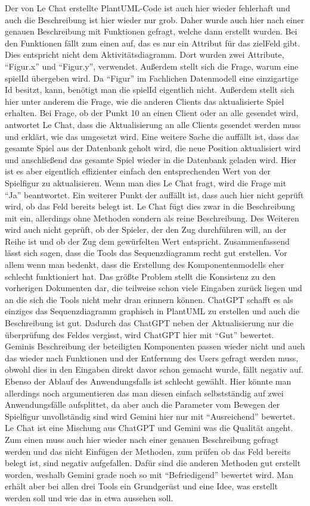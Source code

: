 Der von Le Chat erstellte PlantUML-Code ist auch hier wieder fehlerhaft und auch die Beschreibung ist hier wieder nur 
grob. Daher wurde auch hier nach einer genauen Beschreibung mit Funktionen gefragt, welche dann erstellt wurden.
Bei den Funktionen fällt zum einen auf, das es nur ein Attribut für das zielFeld gibt. Dies entspricht nicht dem 
Aktivitätsdiagramm. Dort wurden zwei Attribute, ``Figur.x'' und ``Figur.y'', verwendet. Außerdem stellt sich die 
Frage, warum eine spielId übergeben wird. Da ``Figur'' im Fachlichen Datenmodell eine einzigartige Id besitzt, 
kann, benötigt man die spielId eigentlich nicht. Außerdem stellt sich hier unter anderem die Frage, wie die anderen
Clients das aktualisierte Spiel erhalten. Bei Frage, ob der Punkt 10 an einen Client oder an alle gesendet wird, 
antwortet Le Chat, dass die Aktualisierung an alle Clients gesendet werden muss und erklärt, wie das umgesetzt wird.
Eine weitere Sache die auffällt ist, dass das gesamte Spiel aus der Datenbank geholt wird, die neue Position 
aktualisiert wird und anschließend das gesamte Spiel wieder in die Datenbank geladen wird. Hier ist es aber 
eigentlich effizienter einfach den entsprechenden Wert von der Spielfigur zu aktualisieren. Wenn man dies 
Le Chat fragt, wird die Frage mit ``Ja'' beantwortet. Ein weiterer Punkt der auffällt ist, dass auch hier nicht 
geprüft wird, ob das Feld bereits belegt ist. Le Chat fügt dies zwar in die Beschreibung mit ein, allerdings 
ohne Methoden sondern als reine Beschreibung. Des Weiteren wird auch nicht geprüft, ob der Spieler, der den 
Zug durchführen will, an der Reihe ist und ob der Zug dem gewürfelten Wert entspricht. 
Zusammenfassend lässt sich sagen, dass die Tools das Sequenzdiagramm recht gut erstellen. Vor allem wenn man 
bedenkt, dass die Erstellung des Komponentenmodells eher schlecht funktioniert hat. Das größte Problem stellt 
die Konsistenz zu den vorherigen Dokumenten dar, die teilweise schon viele Eingaben zurück liegen und an die 
sich die Tools nicht mehr dran erinnern können. ChatGPT schafft es als einziges das Sequenzdiagramm graphisch in 
PlantUML zu erstellen und auch die Beschreibung ist gut. Dadurch das ChatGPT neben der Aktualisierung nur die 
überprüfung des Feldes vergisst, wird ChatGPT hier mit ``Gut'' bewertet. Geminis Beschreibung der beteiligten
Komponenten passen wieder nicht und auch das wieder nach Funktionen und der Entfernung des Users gefragt werden 
muss, obwohl dies in den Eingaben direkt davor schon gemacht wurde, fällt negativ auf. Ebenso der Ablauf 
des Anwendungsfalls ist schlecht gewählt. Hier könnte man allerdings noch argumentieren das man diesen einfach 
selbstständig auf zwei Anwendungsfälle aufsplittet, da aber auch die Parameter vom Bewegen der Spielfigur 
unvollständig sind wird Gemini hier nur mit ``Ausreichend'' bewertet. Le Chat ist eine Mischung aus ChatGPT und 
Gemini was die Qualität angeht. Zum einen muss auch hier wieder nach einer genauen Beschreibung gefragt werden 
und das nicht Einfügen der Methoden, zum prüfen ob das Feld bereits belegt ist, sind negativ aufgefallen. Dafür 
sind die anderen Methoden gut erstellt worden, weshalb Gemini grade noch so mit ``Befriedigend'' bewertet wird.
Man erhält aber bei allen drei Tools ein Grundgerüst und eine Idee, was erstellt werden soll und wie das in etwa
aussehen soll.

